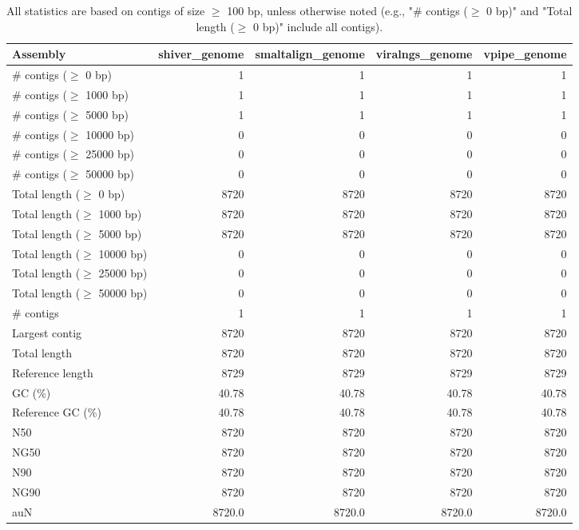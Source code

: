 \documentclass[12pt,a4paper]{article}
\begin{document}
\begin{table}[ht]
\begin{center}
\caption{All statistics are based on contigs of size $\geq$ 100 bp, unless otherwise noted (e.g., "\# contigs ($\geq$ 0 bp)" and "Total length ($\geq$ 0 bp)" include all contigs).}
\begin{tabular}{|l*{4}{|r}|}
\hline
Assembly & shiver\_genome & smaltalign\_genome & viralngs\_genome & vpipe\_genome \\ \hline
\# contigs ($\geq$ 0 bp) & 1 & 1 & 1 & 1 \\ \hline
\# contigs ($\geq$ 1000 bp) & 1 & 1 & 1 & 1 \\ \hline
\# contigs ($\geq$ 5000 bp) & 1 & 1 & 1 & 1 \\ \hline
\# contigs ($\geq$ 10000 bp) & 0 & 0 & 0 & 0 \\ \hline
\# contigs ($\geq$ 25000 bp) & 0 & 0 & 0 & 0 \\ \hline
\# contigs ($\geq$ 50000 bp) & 0 & 0 & 0 & 0 \\ \hline
Total length ($\geq$ 0 bp) & 8720 & 8720 & 8720 & 8720 \\ \hline
Total length ($\geq$ 1000 bp) & 8720 & 8720 & 8720 & 8720 \\ \hline
Total length ($\geq$ 5000 bp) & 8720 & 8720 & 8720 & 8720 \\ \hline
Total length ($\geq$ 10000 bp) & 0 & 0 & 0 & 0 \\ \hline
Total length ($\geq$ 25000 bp) & 0 & 0 & 0 & 0 \\ \hline
Total length ($\geq$ 50000 bp) & 0 & 0 & 0 & 0 \\ \hline
\# contigs & 1 & 1 & 1 & 1 \\ \hline
Largest contig & 8720 & 8720 & 8720 & 8720 \\ \hline
Total length & 8720 & 8720 & 8720 & 8720 \\ \hline
Reference length & 8729 & 8729 & 8729 & 8729 \\ \hline
GC (\%) & 40.78 & 40.78 & 40.78 & 40.78 \\ \hline
Reference GC (\%) & 40.78 & 40.78 & 40.78 & 40.78 \\ \hline
N50 & 8720 & 8720 & 8720 & 8720 \\ \hline
NG50 & 8720 & 8720 & 8720 & 8720 \\ \hline
N90 & 8720 & 8720 & 8720 & 8720 \\ \hline
NG90 & 8720 & 8720 & 8720 & 8720 \\ \hline
auN & 8720.0 & 8720.0 & 8720.0 & 8720.0 \\ \hline

\end{tabular}
\end{center}
\end{table}
\end{document}
